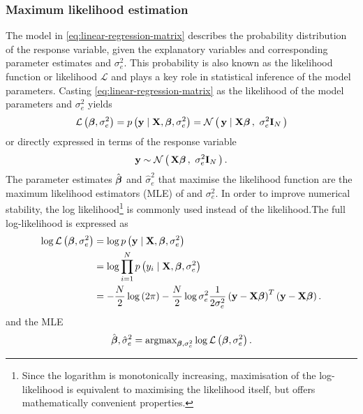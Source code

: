 \subsubsection{Maximum likelihood estimation}
The model in \cref{eq:linear-regression-matrix} describes the probability distribution of the response variable, given the explanatory variables and corresponding parameter estimates \tmat{\beta} and \(\sigma^2_e\). This probability is also known as the likelihood function or likelihood \(\mathcal{L}\) and plays a key role in statistical inference of the model parameters. Casting \cref{eq:linear-regression-matrix} as the likelihood of the model parameters  \tmat{\beta} and \(\sigma^2_e\) yields 
\begin{equation}
\mathcal{L} \left( \boldsymbol{\mathbf{\beta}}, \sigma^2_e \right) = p \left(\boldsymbol{\mathbf{y}} \mid \boldsymbol{\mathbf{X}}, \boldsymbol{\mathbf{\beta}}, \sigma^2_e \right) = \mathcal{N}\left(\,{\boldsymbol{\mathbf{y}} \mid \boldsymbol{\mathbf{X}}\boldsymbol{\mathbf{\beta}}}\,,~{\sigma^2_e\boldsymbol{\mathbf{I}}_{N}}\,\right)
\end{equation}
%
or directly expressed in terms of the response variable
\begin{equation}
\label{eq:normal-matrix}
\boldsymbol{\mathbf{y}} \sim \mathcal{N}\left(\,{\boldsymbol{\mathbf{X}}\boldsymbol{\mathbf{\beta}}}\,,~{\sigma^2_e\boldsymbol{\mathbf{I}}_{N}}\,\right).
\end{equation}
%
The parameter estimates \(\hat{\boldsymbol{\mathbf{\beta}}}\) and \(\hat{\sigma}^2_e\) that maximise the likelihood function are the maximum likelihood estimators (MLE) of \tmat{\beta} and \(\sigma^2_e\). In order to improve numerical stability, the log likelihood\footnote{Since the logarithm is monotonically increasing, maximisation of the log-likelihood is equivalent to maximising the likelihood itself, but offers mathematically convenient properties.} is commonly used instead of the likelihood.The full log-likelihood is expressed as
%
\begin{align}
\log\mathcal{L} \left( \boldsymbol{\mathbf{\beta}}, \sigma^2_e \right) & = \log p \left(\boldsymbol{\mathbf{y}} \mid \boldsymbol{\mathbf{X}}, \boldsymbol{\mathbf{\beta}}, \sigma^2_e \right) \\
& = \log \prod^N_{i=1} p \left(y_i \mid \boldsymbol{\mathbf{X}}, \boldsymbol{\mathbf{\beta}}, \sigma^2_e \right) \\
& =  -\frac{N}{2}\log\left(2\pi\right) - \frac{N}{2}\log\sigma^2_e  \frac{1}{2\sigma^2_e } \left(\boldsymbol{\mathbf{y}} - \boldsymbol{\mathbf{X}}\boldsymbol{\mathbf{\beta}}\right)^T  \left(\boldsymbol{\mathbf{y}} - \boldsymbol{\mathbf{X}}\boldsymbol{\mathbf{\beta}}\right).
\label{eq:log-likelihood}
\end{align}
%
and the MLE
%
\begin{equation}
\hat{\boldsymbol{\mathbf{\beta}}},\hat{\sigma}^2_e = \text{argmax}_{\boldsymbol{\mathbf{\beta}},\sigma^2_e} \log\mathcal{L}\left(\boldsymbol{\mathbf{\beta}},\sigma^2_e\right).
\label{eq:argmax-log}
\end{equation}

